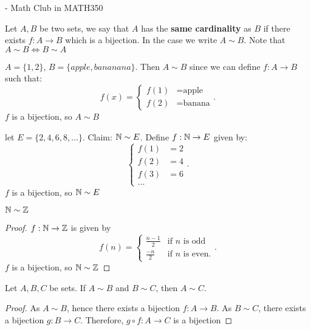 - Math Club in MATH350

\begin{definition}
	Let $A, B$ be two sets, we say that $A$ has the \textbf{same cardinality} as $B$ if there exists $f:A\to B $ which is a bijection. In the case we write $A \sim B$. Note that $A\sim B \iff B \sim A$
\end{definition}


\begin{eg}
	$A = \{1, 2\}$, $B= \{apple, bananana\}$. Then $A \sim B$ since we can define $f: A \to B$ such that:
	\[
	f\left( x \right) =
	\begin{cases}
		f\left( 1 \right) & = \text{apple}\\
		f\left( 2 \right) & = \text{banana}
	\end{cases}
	.\] 
	$f$ is a bijection, so $A \sim B$
\end{eg}

\begin{eg}
	let $E = \{2, 4, 6, 8, \ldots\}$. Claim: $\mathbb{N} \sim E$. Define $f: \mathbb{N} \to E$ given by: 
	\[
		\begin{cases}
			f\left( 1 \right) & = 2 \\
			f\left( 2 \right) & = 4 \\
			f\left( 3 \right) & = 6 \\
			\ldots
		\end{cases}
	.\] 
	$f$ is a bijection, so $\mathbb{N} \sim E$
\end{eg}

\begin{eg}
	$\mathbb{N} \sim \mathbb{Z}$
\end{eg}

\begin{proof}
	$f: \mathbb{N} \to \mathbb{Z}$ is given by 
	\[
	f\left( n \right) = 	
	\begin{cases}
		\frac{n-1}{2} & \text{if $n$ is odd}\\
		\frac{-n}{2} & \text{if $n$ is even}.
	
	\end{cases}
	.\] 
	$f$ is a bijection, so $\mathbb{N} \sim \mathbb{Z}$
\end{proof}

\begin{theorem}
	Let $A, B, C$ be sets. If $A \sim B$ and $B \sim C$, then $A \sim C$.
\end{theorem}

\begin{proof}
	As $A \sim B$, hence there exists a bijection $f:A \to B$. As $B \sim C$, there exists a bijection $g:B \to C$. Therefore, $g \circ f: A \to C$ is a bijection
\end{proof}


